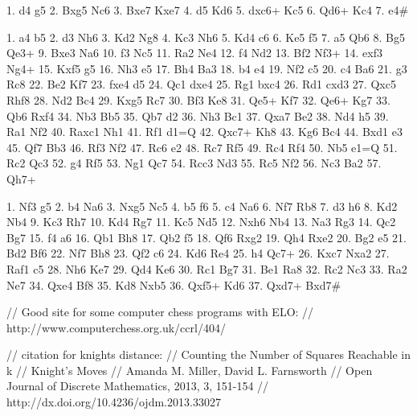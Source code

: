 
% 


1. d4 g5 2. Bxg5 Nc6 3. Bxe7 Kxe7 4. d5 Kd6
5. dxc6+ Kc5 6. Qd6+ Kc4 7. e4#

1. a4 b5 2. d3 Nh6 3. Kd2 Ng8 4. Kc3 Nh6
5. Kd4 c6 6. Ke5 f5 7. a5 Qb6 8. Bg5 Qe3+
9. Bxe3 Na6 10. f3 Nc5 11. Ra2 Ne4 12. f4 Nd2
13. Bf2 Nf3+ 14. exf3 Ng4+ 15. Kxf5 g5 16. Nh3 e5
17. Bh4 Ba3 18. b4 e4 19. Nf2 c5 20. c4 Ba6
21. g3 Rc8 22. Be2 Kf7 23. fxe4 d5 24. Qc1 dxe4
25. Rg1 bxc4 26. Rd1 cxd3 27. Qxc5 Rhf8 28. Nd2 Bc4
29. Kxg5 Rc7 30. Bf3 Ke8 31. Qe5+ Kf7 32. Qe6+ Kg7
33. Qb6 Rxf4 34. Nb3 Bb5 35. Qb7 d2 36. Nh3 Bc1
37. Qxa7 Be2 38. Nd4 h5 39. Ra1 Nf2 40. Raxc1 Nh1
41. Rf1 d1=Q 42. Qxc7+ Kh8 43. Kg6 Bc4 44. Bxd1 e3
45. Qf7 Bb3 46. Rf3 Nf2 47. Rc6 e2 48. Rc7 Rf5
49. Rc4 Rf4 50. Nb5 e1=Q 51. Rc2 Qc3 52. g4 Rf5
53. Ng1 Qc7 54. Rcc3 Nd3 55. Rc5 Nf2 56. Nc3 Ba2
57. Qh7+

1. Nf3 g5 2. b4 Na6 3. Nxg5 Nc5 4. b5 f6
5. c4 Na6 6. Nf7 Rb8 7. d3 h6 8. Kd2 Nb4
9. Kc3 Rh7 10. Kd4 Rg7 11. Kc5 Nd5 12. Nxh6 Nb4
13. Na3 Rg3 14. Qc2 Bg7 15. f4 a6 16. Qb1 Bh8
17. Qb2 f5 18. Qf6 Rxg2 19. Qh4 Rxe2 20. Bg2 e5
21. Bd2 Bf6 22. Nf7 Bh8 23. Qf2 c6 24. Kd6 Re4
25. h4 Qc7+ 26. Kxc7 Nxa2 27. Raf1 c5 28. Nh6 Ke7
29. Qd4 Ke6 30. Rc1 Bg7 31. Be1 Ra8 32. Rc2 Nc3
33. Ra2 Ne7 34. Qxe4 Bf8 35. Kd8 Nxb5 36. Qxf5+ Kd6
37. Qxd7+ Bxd7#

// Good site for some computer chess programs with ELO:
// http://www.computerchess.org.uk/ccrl/404/


// citation for knights distance:
// Counting the Number of Squares Reachable in k
// Knight's Moves
// Amanda M. Miller, David L. Farnsworth
// Open Journal of Discrete Mathematics, 2013, 3, 151-154
// http://dx.doi.org/10.4236/ojdm.2013.33027 

